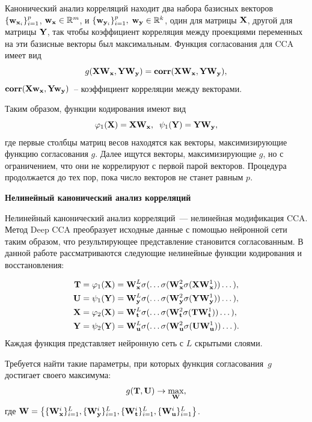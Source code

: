 Канонический анализ корреляций находит два набора базисных векторов $\{\mathbf{w}_{\mathbf{x}_i}\}_{i=1}^{p}$, $\mathbf{w}_{\mathbf{x}} \in \mathbb{R}^{m}$, и $\{\mathbf{w}_{\mathbf{y}_i}\}_{i=1}^{p}, \; \mathbf{w}_{\mathbf{y}} \in \mathbb{R}^{k}$, один для матрицы $\mathbf{X}$, другой для матрицы $\mathbf{Y}$, так чтобы коэффициент корреляция между проекциями переменных на эти базисные векторы был максимальным. Функция согласования для CCA имеет вид
\begin{equation*}
	g(\mathbf{X} \mathbf{W}_{\mathbf{x}}, \mathbf{Y} \mathbf{W}_{\mathbf{y}}) = \textbf{corr}(\mathbf{X} \mathbf{W}_{\mathbf{x}}, \mathbf{Y} \mathbf{W}_{\mathbf{y}}),
\end{equation*}
 $\textbf{corr}(\mathbf{X} \mathbf{w}_{\mathbf{x}}, \mathbf{Y} \mathbf{w}_{\mathbf{y}})$~-- коэффициент корреляции между векторами.

Таким образом, функции кодирования имеют вид
\begin{equation*}
	\varphi_1(\mathbf{X}) = \mathbf{X} \mathbf{W}_{\mathbf{x}} , \;\;
	\psi_1(\mathbf{Y}) = \mathbf{Y} \mathbf{W}_{\mathbf{y}},
\end{equation*}
где первые столбцы матриц весов находятся как векторы, максимизирующие функцию согласования $g$. Далее ищутся векторы, максимизирующие $g$, но с ограничением, что они не коррелируют с первой парой векторов. Процедура продолжается до тех пор, пока число векторов не станет равным $p$.

\textbf{Нелинейный канонический анализ корреляций}

Нелинейный канонический анализ корреляций~--- нелинейная модификация CCA. Метод Deep CCA преобразует исходные данные с помощью нейронной сети таким образом, что результирующее представление становится согласованным. В данной работе рассматриваются следующие нелинейные функции кодирования и восстановления:

\begin{align*}
	\mathbf{T} &= \varphi_1(\mathbf{X}) =  \mathbf{W}_{\mathbf{x}}^L \sigma(\dots \sigma(\mathbf{W}_{\mathbf{x}}^2 \sigma(\mathbf{X} \mathbf{W}_{\mathbf{x}}^1)) \dots ), \\
	\mathbf{U} &= \psi_1(\mathbf{Y}) =  \mathbf{W}_{\mathbf{y}}^L \sigma(\dots \sigma(\mathbf{W}_{\mathbf{y}}^2 \sigma(\mathbf{Y} \mathbf{W}_{\mathbf{y}}^1)) \dots ), \\
	\mathbf{X} &= \varphi_2(\mathbf{X}) =  \mathbf{W}_{\mathbf{t}}^L \sigma(\dots \sigma(\mathbf{W}_{\mathbf{t}}^2 \sigma(\mathbf{T} \mathbf{W}_{\mathbf{t}}^1)) \dots ), \\
	\mathbf{Y} &= \psi_2(\mathbf{Y}) =  \mathbf{W}_{\mathbf{u}}^L \sigma(\dots \sigma(\mathbf{W}_{\mathbf{u}}^2 \sigma(\mathbf{U} \mathbf{W}_{\mathbf{u}}^1)) \dots ).
\end{align*}
Каждая функция представляет нейронную сеть с $L$ скрытыми слоями.

Требуется найти такие параметры, при которых функция согласования~$g$ достигает своего максимума:
\begin{equation}
	g(\mathbf{T}, \mathbf{U}) \rightarrow \max_{\mathbf{W}},
	\label{concordance}
\end{equation}
где $\mathbf{W} = \bigl\{\{\mathbf{W}_{\mathbf{x}}^i\}_{i=1}^L, \{\mathbf{W}_{\mathbf{y}}^i\}_{i=1}^L, \{\mathbf{W}_{\mathbf{t}}^i\}_{i=1}^L, \{\mathbf{W}_{\mathbf{u}}^i\}_{i=1}^L\bigr\}$.

